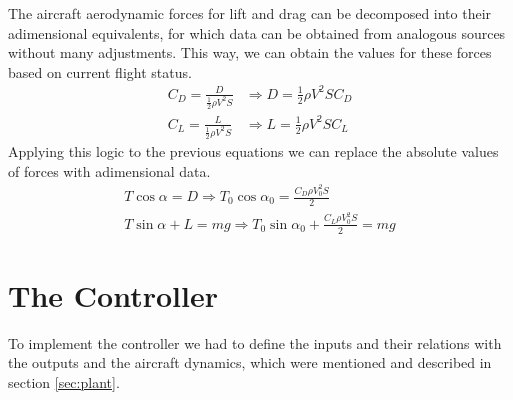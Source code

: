 \documentclass[english,palatino]{ist-report}
\begin{document}
The aircraft aerodynamic forces for lift and drag can be decomposed into their adimensional equivalents, for which data can be obtained from analogous sources without many adjustments. This way, we can obtain the values for these forces based on current flight status.
\begin{align}
	\label{eq:cd} C_D = \frac{D}{\frac{1}{2}\rho V^2S} &\Rightarrow D = \frac{1}{2}\rho V^2SC_D \\
	\label{eq:cl} C_L = \frac{L}{\frac{1}{2}\rho V^2S} &\Rightarrow L = \frac{1}{2}\rho V^2SC_L
\end{align}
Applying this logic to the previous equations we can replace the absolute values of forces with adimensional data.
\begin{gather*}
	T\cos\alpha = D \Rightarrow T_0\cos{\alpha_0} = \frac{C_D\rho V_0^2S}{2} \\
	T\sin\alpha + L = mg \Rightarrow T_0\sin{\alpha_0} + \frac{C_L\rho V_0^2S}{2} = mg
\end{gather*}

\section{The Controller}

To implement the controller we had to define the inputs and their relations with the outputs and the aircraft dynamics, which were mentioned and described in section \ref{sec:plant}.
\end{document}
